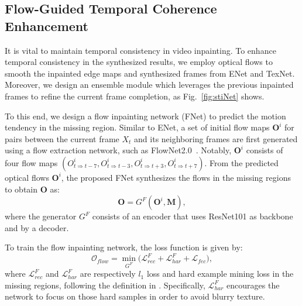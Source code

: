 \subsection{Flow-Guided Temporal Coherence Enhancement}
\label{sec:fec}
It is vital to maintain temporal consistency in video inpainting.
To enhance temporal consistency in the synthesized results, we employ optical flows to smooth the inpainted edge maps and synthesized frames from ENet and TexNet.
Moreover, we design an ensemble module which leverages the previous inpainted frames to refine the current frame completion, as Fig.~\ref{fig:stiNet} shows. 



To this end, we design a flow inpainting network (FNet) to predict the motion tendency in the missing region.
%
Similar to ENet, a set of initial flow maps \(\boldsymbol{O}^i\) for pairs between the current frame $X_t$ and its neighboring frames are first generated using a flow extraction network, such as FlowNet2.0~\cite{Flownet_2017_CVPR}.
Notably, \(\boldsymbol{O}^i\) consists of four flow maps \((O^i_{t\Rightarrow t-7}, O^i_{t\Rightarrow t-3}, O^i_{t\Rightarrow t+3}, O^i_{t\Rightarrow t+7})\).
From the predicted optical flows $\boldsymbol{O}^i$, the proposed FNet synthesizes the flows in the missing regions to obtain \(\boldsymbol{O}\) as:
\begin{equation}
	\label{eq:flownet}
	\boldsymbol{O}=G^F(\boldsymbol{O}^{i},\boldsymbol{M}),
\end{equation}
where the generator $G^F$ consists of an encoder that uses ResNet101 \cite{He_2016_CVPR} as backbone and by a decoder.

To train the flow inpainting network, the loss function is given by:
\begin{equation}
	\label{eq:flow_all}
	\mathcal{O}_{flow}=\min\limits_{G^F} \big(\mathcal{L}^F_{rec}+ \mathcal{L}^F_{har}+\mathcal{L}_{fec}\big),
\end{equation}
where $\mathcal{L}^F_{rec}$ and $\mathcal{L}^F_{har}$ are respectively $l_1$ loss and hard example mining loss in the missing regions, following the definition in \cite{Xu_2019_CVPR}. 
Specifically, $\mathcal{L}^F_{har}$ encourages the network to focus on those hard samples in order to avoid blurry texture.




